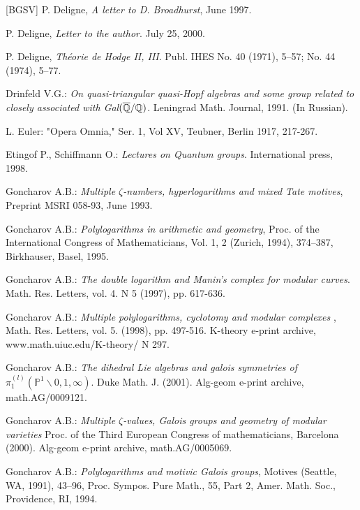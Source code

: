 \documentclass[10pt]{article}
\begin{document}
\begin{thebibliography}{[BGSV]}
 P. Deligne, {\it A letter to D. Broadhurst}, June 1997.

 P. Deligne, {\it Letter to the author}. July 25, 2000.

 P. Deligne, {\it Th\'eorie de Hodge II, III}. Publ. IHES No. 40 (1971), 5--57;
No. 44 (1974), 5--77.

 Drinfeld V.G.: {\it On quasi-triangular quasi-Hopf algebras and some group related to closely associated with Gal$(\overline{{\mathbb Q}}/{\mathbb Q})$}. Leningrad Math. Journal, 1991. (In Russian).

 L. Euler: "Opera Omnia," Ser. 1, Vol XV, Teubner,
Berlin 1917, 217-267.  

 Etingof P., Schiffmann O.: {\it Lectures on Quantum groups}.
 International press, 1998. 

 Goncharov A.B.: {\it Multiple $\zeta$-numbers,
    hyperlogarithms and mixed Tate motives}, Preprint MSRI 058-93, June 1993.

 Goncharov A.B.: {\it Polylogarithms in arithmetic and geometry}, 
Proc. of the International Congress of Mathematicians, Vol. 1, 2
(Zurich, 1994), 374--387, Birkhauser, Basel, 1995.

 Goncharov A.B.: {\it The double logarithm and Manin's
complex for modular curves}. Math. Res. Letters,
 vol. 4. N 5 (1997), pp. 617-636. 

 Goncharov A.B.: {\it Multiple polylogarithms, cyclotomy and modular complexes
},     Math. Res. Letters, 
 vol. 5. (1998), pp. 497-516. K-theory e-print archive, www.math.uiuc.edu/K-theory/ N 297.

 Goncharov A.B.: {\it The dihedral Lie algebras and galois symmetries of 
$\pi_1^{(l)}({\mathbb P}^1 \backslash 0,1, \infty)$}. Duke Math. J.  (2001). 
Alg-geom e-print archive, math.AG/0009121.

 Goncharov A.B.: {\it Multiple $\zeta$-values, Galois groups and geometry of 
modular varieties} Proc. of the Third European Congress of mathematicians, Barcelona (2000). Alg-geom e-print archive, math.AG/0005069.

 Goncharov A.B.: {\it Polylogarithms and motivic Galois groups}, Motives (Seattle, WA, 1991), 43--96, Proc. Sympos. Pure Math., 55, Part 2,
Amer. Math. Soc., Providence, RI, 1994.


\end{thebibliography}
\end{document}
